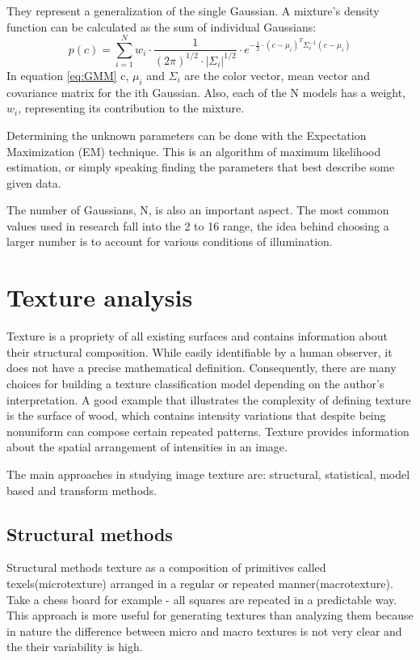 \documentclass[12pt]{report}
\begin{document}
	They represent a generalization of the single Gaussian. A mixture's density function can be calculated as the sum of individual Gaussians\cite{survey_skin_color_modeling}:
	\begin{equation} \label{eq:GMM}
	p(c) = \sum_{i=1}^{N}w_i \cdot \frac{1}{(2\pi)^{1/2} \cdot |\Sigma_i|^{1/2}} \cdot e^{-\frac{1}{2} \cdot (c - \mu_i)^T\Sigma_i^{-1}(c - \mu_i)}
	\end{equation}
	In equation \ref{eq:GMM} c, \(\mu_i\) and \(\Sigma_i\) are the color vector, mean vector and covariance matrix for the ith Gaussian. Also, each of the N models has a weight, \(w_i\), representing its contribution to the mixture. 
	
	Determining the unknown parameters can be done with the Expectation Maximization (EM) technique\cite{Yang99gaussianmixture}. This is an algorithm of maximum likelihood estimation, or simply speaking finding the parameters that best describe some given data.
	
	The number of Gaussians, N, is also an important aspect. The most common values used in research fall into the 2 to 16 range\cite{survey_skin_color_modeling}, the idea behind choosing a larger number is to account for various conditions of illumination.
	
	\section{Texture analysis}
	
	Texture is a propriety of all existing surfaces and contains information about their structural composition. While easily identifiable by a human observer, it does not have a precise mathematical definition\cite{computer_vision_book}. Consequently, there are many choices for building a texture classification model depending on the author’s interpretation. A good example that illustrates the complexity of defining texture is the surface of wood, which contains intensity variations that despite being nonuniform can compose certain repeated patterns. Texture provides information about the spatial arrangement of intensities in an image\cite{computer_vision_book}. 
	
	The main approaches in studying image texture are: structural, statistical, model based and transform methods\cite{texture_analysis_review}. 
	
	\subsection{Structural methods}
	Structural methods texture as a composition of primitives called texels(microtexture) arranged in a regular or repeated manner(macrotexture). Take a chess board for example - all squares are repeated in a predictable way. This approach is more useful for generating textures than analyzing them because in nature the difference between micro and macro textures is not very clear and the their variability is high.
	
\end{document}
